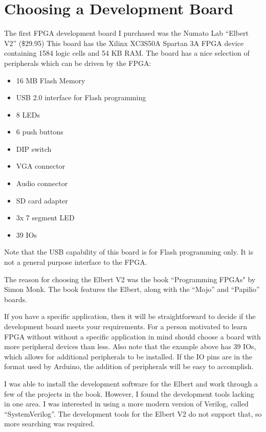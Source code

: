 \section{Choosing a Development Board}

The first FPGA development board I purchased was the Numato Lab ``Elbert V2'' (\$29.95)
This board has the Xilinx XC3S50A Spartan 3A FPGA device containing 1584 logic cells and
54 KB RAM.  The board has a nice selection of peripherals which can be driven
by the FPGA:

\begin{itemize}
	\item 16 MB Flash Memory
	\item USB 2.0 interface for Flash programming
	\item 8 LEDs
	\item 6 push buttons
	\item DIP switch
	\item VGA connector
	\item Audio connector
	\item SD card adapter
	\item 3x 7 segment LED
	\item 39 IOs
\end{itemize}

Note that the USB capability of this board is for Flash programming only.  It is not a general purpose interface to the FPGA.

The reason for choosing the Elbert V2 was the book ``Programming FPGAs" by Simon Monk.  The book features the Elbert, along with the ``Mojo'' and ``Papilio'' boards.

If you have a specific application, then it will be straightforward to decide if the development board meets your requirements.  For a person motivated to learn FPGA without without a specific application in mind should choose a board with more peripheral devices than less.  Also note that the example above has 39 IOs, which allows for additional peripherals to be installed.  If the IO pins are in the format used by Arduino, the addition of peripherals will be easy to accomplish.

I was able to install the development software for the Elbert and work through a few of the projects in the book.
However, I found the development tools lacking in one area.  I was interested in using a more modern version of Verilog, called ``SystemVerilog''.  The development tools for the Elbert V2 do not support that, so more searching was required.

